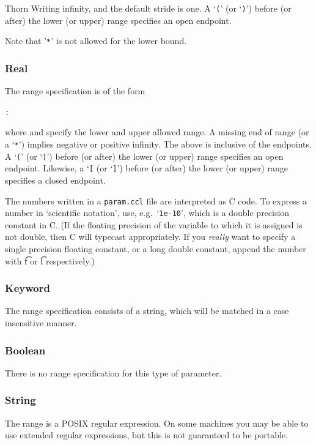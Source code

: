 \begin{cactuspart}{Thorn Writing}
infinity, and the default stride is one.
A `\texttt{(}' (or `\texttt{)}') before (or after) the lower (or upper) range specifies an open
endpoint.

Note that '\texttt{*}' is not allowed for the lower bound.

\subsubsection{Real}

The range specification is of the form
\begin{alltt}
:
\end{alltt}
where  and  specify the lower and upper allowed
range.  A missing end of range (or a `\texttt{*}') implies negative or positive
infinity.  The above is inclusive of the endpoints.
A `\texttt{(}' (or `\texttt{)}') before (or after) the lower (or upper) range specifies an open
endpoint.
Likewise, a `\texttt{[} (or `\texttt{]}') before (or after) the lower
(or upper) range specifies a closed endpoint.

The numbers written in a \texttt{param.ccl} file are interpreted as C code.
To express a number in `scientific notation', use,
e.g.\ `\texttt{1e-10}', which is a double precision constant in C.  (If the
floating precision of the variable to which it is assigned is not
double, then C will typecast appropriately.  If you \emph{really} want to
specify a single precision floating constant, or a long double
constant, append the number with {\t f} or {\t l} respectively.)

\subsubsection{Keyword}

The range specification consists of a string, which will be matched in
a case insensitive manner.

\subsubsection{Boolean}

There is no range specification for this type of parameter.

\subsubsection{String}

The range is a POSIX regular expression.  On some machines you may be
able to use extended regular expressions, but this is not guaranteed
to be portable.


\end{cactuspart}
